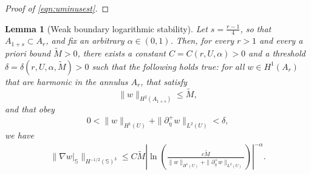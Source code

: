\documentclass[a4paper, 11pt]{article}
\newtheorem{lemma}[theorem]{Lemma}
\renewcommand{\SS}{\mathbb{S}}
\begin{document}
\begin{proof}[Proof of \eqref{eqn:uminusest}]





























































	
	
	
	
	
	
	
	
	

\end{proof}



\begin{lemma}[Weak boundary logarithmic stability]\label{lem:carleman}
Let $s=\tfrac{r-1}{4}$, so that $A_{1+s}\subset A_r$, and fix an arbitrary $\alpha\in(0,1)$. Then, for every $r>1$ and every a priori bound $\tilde{M}>0$, there exists a constant $C=C(r,U,\alpha)>0$ and a threshold $\delta=\delta(r,U,\alpha,\tilde{M})>0$ such that the following holds true: for all $w\in H^1(A_{r})$ that are harmonic in the annulus $A_r$, that satisfy
    \[
        \|w\|_{H^2(A_{1+s})}\le \tilde{M},
    \]
    and that obey
    \[
		0<\|w\|_{H^1(U)}+\|\partial_\eta^+ w\|_{L^2(U)}<\delta,
	\]
    we have
	\begin{align}
		\|\nabla w|_\SS\|_{H^{-1/2}(\SS)^3}
		\leq C \tilde{M}
		\left| \ln\left(\frac{c\tilde{M}}{\|w\|_{H^1(U)}+\|\partial_\eta^+ w\|_{L^2(U)}}\right)\right|^{-\alpha}.\label{eqn:carleman-new}
	\end{align}

\end{lemma}
\end{document}
